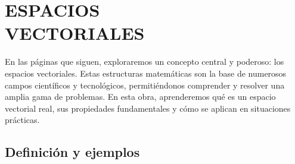 \chapter[ESPACIOS VECTORIALES]{ESPACIOS \\ VECTORIALES}\label{chap:ev}
\printchaptertableofcontents

En las páginas que siguen, exploraremos un concepto central y poderoso: los espacios vectoriales. Estas estructuras matemáticas son la base de numerosos campos científicos y tecnológicos, permitiéndonos comprender y resolver una amplia gama de problemas. En esta obra, aprenderemos qué es un espacio vectorial real, sus propiedades fundamentales y cómo se aplican en situaciones prácticas.

\section{Definición y ejemplos}

